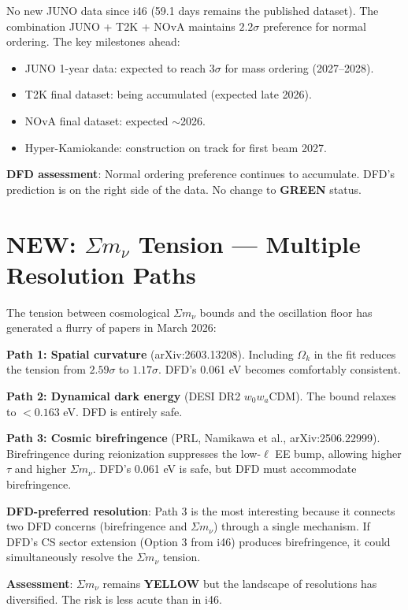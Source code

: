\documentclass[11pt,a4paper]{article}
\newcommand{\GREEN}{\textcolor{dfdgreen}{\textbf{GREEN}}}
\newcommand{\YELLOW}{\textcolor{dfdyellow}{\textbf{YELLOW}}}
\newcommand{\NEW}{\textcolor{dfdblue}{\textbf{NEW}}}
\begin{document}
\begin{tcolorbox}[colback=green!5!white, colframe=green!60!black,
  title={Mass Ordering Trend: $2.2\sigma$ Normal --- Unchanged but Accumulating}]

No new JUNO data since i46 (59.1 days remains the published dataset). The combination JUNO + T2K + NOvA maintains $2.2\sigma$ preference for normal ordering. The key milestones ahead:
\begin{itemize}
\item JUNO 1-year data: expected to reach $3\sigma$ for mass ordering (2027--2028).
\item T2K final dataset: being accumulated (expected late 2026).
\item NOvA final dataset: expected $\sim$2026.
\item Hyper-Kamiokande: construction on track for first beam 2027.
\end{itemize}

\textbf{DFD assessment}: Normal ordering preference continues to accumulate. DFD's prediction is on the right side of the data. No change to \GREEN{} status.
\end{tcolorbox}

\section{\NEW: $\Sigma m_\nu$ Tension --- Multiple Resolution Paths}

\begin{tcolorbox}[colback=yellow!5!white, colframe=yellow!60!black,
  title={$\Sigma m_\nu$ Tension Update: Three Resolution Paths Identified}]

The tension between cosmological $\Sigma m_\nu$ bounds and the oscillation floor has generated a flurry of papers in March 2026:

\textbf{Path 1: Spatial curvature} (arXiv:2603.13208). Including $\Omega_k$ in the fit reduces the tension from $2.59\sigma$ to $1.17\sigma$. DFD's 0.061 eV becomes comfortably consistent.

\textbf{Path 2: Dynamical dark energy} (DESI DR2 $w_0 w_a$CDM). The bound relaxes to $< 0.163$ eV. DFD is entirely safe.

\textbf{Path 3: Cosmic birefringence} (PRL, Namikawa et al., arXiv:2506.22999). Birefringence during reionization suppresses the low-$\ell$ EE bump, allowing higher $\tau$ and higher $\Sigma m_\nu$. DFD's 0.061 eV is safe, but DFD must accommodate birefringence.

\textbf{DFD-preferred resolution}: Path 3 is the most interesting because it connects two DFD concerns (birefringence and $\Sigma m_\nu$) through a single mechanism. If DFD's CS sector extension (Option 3 from i46) produces birefringence, it could simultaneously resolve the $\Sigma m_\nu$ tension.

\textbf{Assessment}: $\Sigma m_\nu$ remains \YELLOW{} but the landscape of resolutions has diversified. The risk is less acute than in i46.
\end{tcolorbox}
\end{document}
